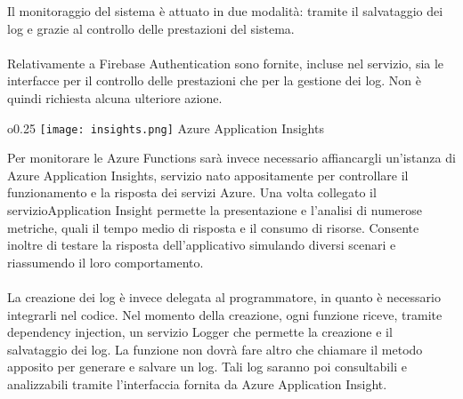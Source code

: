 Il monitoraggio del sistema è attuato in due modalità:
tramite il salvataggio dei log e grazie al controllo delle prestazioni del sistema.\\
\\
Relativamente a Firebase Authentication sono fornite, incluse nel servizio,
sia le interfacce per il controllo delle prestazioni che per la gestione dei log.
Non è quindi richiesta alcuna ulteriore azione.\\
\begin{wrapfigure}{o}{0.25\textwidth}
    \centering
    \texttt{[image: insights.png]}
    Azure Application Insights
\end{wrapfigure}
Per monitorare le Azure Functions sarà invece necessario
affiancargli un'istanza di Azure Application Insights,
servizio nato appositamente per controllare il funzionamento e la risposta dei servizi Azure.
Una volta collegato il servizioApplication Insight
permette la presentazione e l'analisi di numerose metriche,
quali il tempo medio di risposta e il consumo di risorse.
Consente inoltre di testare la risposta dell'applicativo
simulando diversi scenari e riassumendo il loro comportamento.\\
\\
La creazione dei log è invece delegata al programmatore,
in quanto è necessario integrarli nel codice.
Nel momento della creazione, ogni funzione riceve, tramite dependency injection,
un servizio Logger che permette la creazione e il salvataggio dei log.
La funzione non dovrà fare altro che chiamare
il metodo apposito per generare e salvare un log.
Tali log saranno poi consultabili e analizzabili tramite l'interfaccia fornita da Azure Application Insight.
\clearpage